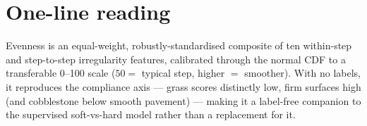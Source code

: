 \documentclass[11pt]{article}
\begin{document}
\section*{One-line reading}
Evenness is an equal-weight, robustly-standardised composite of ten within-step and step-to-step
irregularity features, calibrated through the normal CDF to a transferable 0--100 scale
($50=$ typical step, higher $=$ smoother). With no labels, it reproduces the compliance axis ---
grass scores distinctly low, firm surfaces high (and cobblestone below smooth pavement) --- making it a label-free companion to the
supervised soft-vs-hard model rather than a replacement for it.
\end{document}
